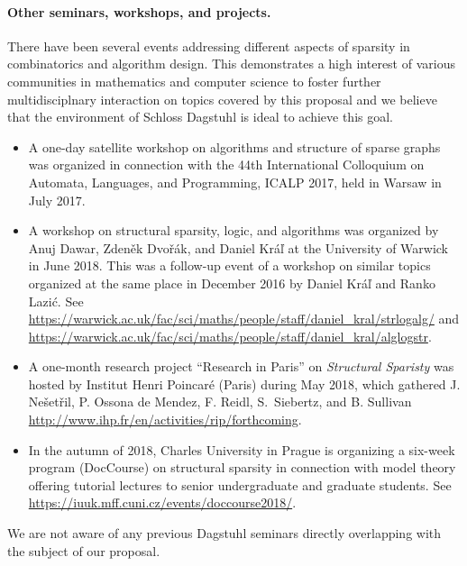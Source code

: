 \paragraph*{Other seminars, workshops, and projects.}
There have been several events addressing different aspects of sparsity in combinatorics and algorithm design.
This demonstrates a high interest of various communities in mathematics and computer science
to foster further multidisciplnary interaction on topics covered by this proposal and
we believe that the environment of Schloss Dagstuhl is ideal to achieve this goal.
\begin{itemize}
\item A one-day satellite workshop on algorithms and structure of sparse graphs was organized in connection with the 44th International Colloquium on Automata, Languages, and Programming, ICALP 2017, held in Warsaw in July 2017.
\item A workshop on structural sparsity, logic, and algorithms was organized by Anuj Dawar, Zden\v ek Dvo\v{r}\'ak, and Daniel Kr\'a\v{l} at the University of Warwick in June 2018. This was a follow-up event of a workshop on similar topics organized at the same place in December 2016 by Daniel Kr\'a\v{l} and Ranko Lazi\'c. See \url{https://warwick.ac.uk/fac/sci/maths/people/staff/daniel_kral/strlogalg/}
and \url{https://warwick.ac.uk/fac/sci/maths/people/staff/daniel_kral/alglogstr}.
\item A one-month research project ``Research in Paris'' on {\em Structural Sparisty} was hosted by Institut Henri Poincar\'e (Paris) during May 2018, which gathered J. Ne\v set\v ril, P. Ossona de Mendez, F. Reidl, S.~Siebertz, and B. Sullivan 
\url{http://www.ihp.fr/en/activities/rip/forthcoming}.
\item In the autumn of 2018, Charles University in Prague is organizing a six-week program (DocCourse) on structural sparsity in connection with model theory offering tutorial lectures to senior undergraduate and graduate students. See \url{https://iuuk.mff.cuni.cz/events/doccourse2018/}.
\end{itemize}
We are not aware of any previous Dagstuhl seminars directly overlapping with the subject of our proposal.
